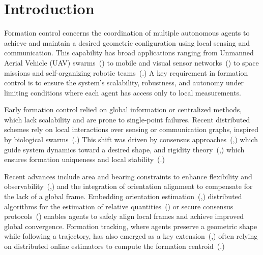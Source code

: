 \documentclass{ifac/ifacconf}
\begin{document}
\section{Introduction}\label{sec:intro}


Formation control concerns the coordination of multiple autonomous agents to achieve and maintain a desired geometric configuration using local sensing and communication. This capability has broad applications ranging from Unmanned Aerial Vehicle (UAV) swarms~(\cite{anderson2008uav,wang2024distributed}) to mobile and visual sensor networks~(\cite{wang2005formation,varotto2022visual}) to space missions and self-organizing robotic teams~(\cite{beard2001coordination,Fabris2019coverage}.) A key requirement in formation control is to ensure the system's scalability, robustness, and autonomy under %
limiting conditions where each agent has access only to local measurements.

Early formation control relied on global information or centralized methods, which lack scalability and are prone to single-point failures. Recent distributed schemes rely on local interactions over sensing or communication graphs, inspired by biological swarms~(\cite{reynolds1987flocks}.) This shift was driven by consensus approaches~(\cite{olfati2007consensus},) which guide system dynamics toward a desired shape, and rigidity theory~(\cite{thorpe1999rigidity},) which ensures formation uniqueness and local stability~(\cite{de2019formation}.)




Recent advances include area and bearing constraints to enhance flexibility and observability~(\cite{trinh2018bearing,zhao2019bearing,Fabris2022bearing},) and the integration of orientation alignment to compensate for the lack of a global frame. Embedding orientation estimation~(\cite{bertoni2022indoor},) distributed algorithms for the estimation of relative quantities~(\cite{garin2010survey,Fabris2022SERM}) or secure consensus protocols~(\cite{Fabris2022robustconsensus,Fabris2023structuredconsensus}) enables agents to safely align local frames and achieve improved global convergence. Formation tracking, where agents preserve a geometric shape while following a trajectory, has also emerged as a key extension~(\cite{ Fabris2019formation1,FABRIS2024OIFT},) often relying on distributed online estimators to compute the formation centroid~(\cite{antonelli2012decentralized}.)
\end{document}
